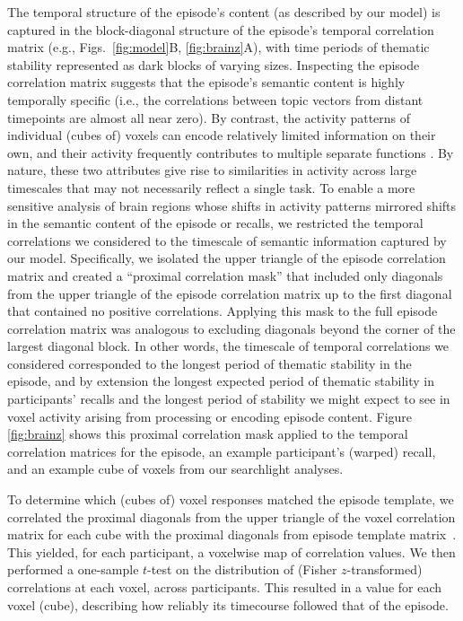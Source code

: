 \documentclass{article}
\begin{document}
The temporal structure of the episode's content (as described by our model) is captured in the block-diagonal structure of the episode's temporal correlation matrix (e.g., Figs.~\ref{fig:model}B, \ref{fig:brainz}A), with time periods of thematic stability represented as dark blocks of varying sizes.  Inspecting the episode correlation matrix suggests that the episode's semantic content is highly temporally specific (i.e., the correlations between topic vectors from distant timepoints are almost all near zero).  By contrast, the activity patterns of individual (cubes of) voxels can encode relatively limited information on their own, and their activity frequently contributes to multiple separate functions \citep{FreeEtal01, SigmDeha08, CharKoec10, RishEtal13}.  By nature, these two attributes give rise to similarities in activity across large timescales that may not necessarily reflect a single task.  To enable a more sensitive analysis of brain regions whose shifts in activity patterns mirrored shifts in the semantic content of the episode or recalls, we restricted the temporal correlations we considered to the timescale of semantic information captured by our model.  Specifically, we isolated the upper triangle of the episode correlation matrix and created a ``proximal correlation mask'' that included only diagonals from the upper triangle of the episode correlation matrix up to the first diagonal that contained no positive correlations.  Applying this mask to the full episode correlation matrix was analogous to excluding diagonals beyond the corner of the largest diagonal block.  In other words, the timescale of temporal correlations we considered corresponded to the longest period of thematic stability in the episode, and by extension the longest expected period of thematic stability in participants' recalls and the longest period of stability we might expect to see in voxel activity arising from processing or encoding episode content.  Figure \ref{fig:brainz} shows this proximal correlation mask applied to the temporal correlation matrices for the episode, an example participant's (warped) recall, and an example cube of voxels from our searchlight analyses.

To determine which (cubes of) voxel responses matched the episode template, we correlated the proximal diagonals from the upper triangle of the voxel correlation matrix for each cube with the proximal diagonals from episode template matrix~\citep{KrieEtal08b}.  This yielded, for each participant, a voxelwise map of correlation values.  We then performed a one-sample $t$-test on the distribution of (Fisher $z$-transformed) correlations at each voxel, across participants.  This resulted in a value for each voxel (cube), describing how reliably its timecourse followed that of the episode.
\end{document}
